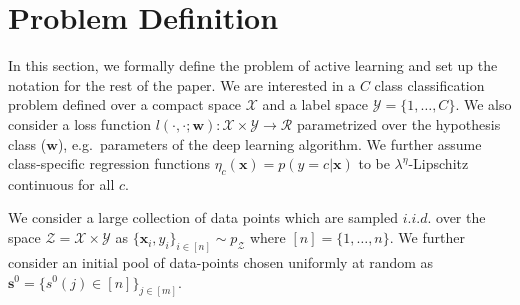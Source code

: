 \documentclass{article}
\begin{document}
\section{Problem Definition}
In this section, we formally define the problem of active learning and set up the notation for the rest of the paper. We are interested in a $C$ class classification problem defined over a compact space $\mathcal{X}$ and a label space  $\mathcal{Y}=\{1,\ldots,C\}$. We also consider a loss function $l(\cdot,\cdot;\mathbf{w}):\mathcal{X}\times \mathcal{Y} \rightarrow \mathcal{R}$ parametrized over the hypothesis class ($\mathbf{w}$), e.g.\ parameters of the deep learning algorithm. We further assume class-specific regression functions $\eta_c(\mathbf{x})=p(y=c|\mathbf{x})$ to be \mbox{$\lambda^\eta$-Lipschitz} continuous for all $c$.

We consider a large collection of data points which are sampled $i.i.d.$ over the space  $\mathcal{Z}=\mathcal{X}\times\mathcal{Y}$ as \mbox{$\{\mathbf{x}_i,y_i\}_{i \in [n]} \sim p_\mathcal{Z}$} where $[n]=\{1,\ldots,n\}$. We further consider an initial pool of data-points chosen uniformly at random as \mbox{$\mathbf{s}^0=\{s^0(j) \in [n]\}_{j \in [m]}$}.
\end{document}
